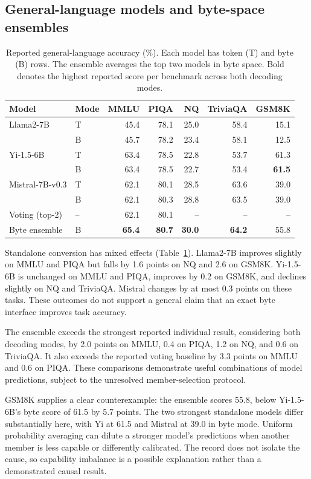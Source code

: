 \documentclass{article}
\begin{document}
\subsection{General-language models and byte-space ensembles}
\label{sec:general}
\begin{table}[t]
\caption{Reported general-language accuracy (\%). Each model has token (T) and byte (B) rows. The ensemble averages the top two models in byte space. Bold denotes the highest reported score per benchmark across both decoding modes.}
\label{tab:general}
\centering
\begin{tabular}{llrrrrr}
\toprule
Model & Mode & MMLU & PIQA & NQ & TriviaQA & GSM8K\\
\midrule
Llama2-7B & T & 45.4 & 78.1 & 25.0 & 58.4 & 15.1\\
 & B & 45.7 & 78.2 & 23.4 & 58.1 & 12.5\\
Yi-1.5-6B & T & 63.4 & 78.5 & 22.8 & 53.7 & 61.3\\
 & B & 63.4 & 78.5 & 22.7 & 53.4 & \textbf{61.5}\\
Mistral-7B-v0.3 & T & 62.1 & 80.1 & 28.5 & 63.6 & 39.0\\
 & B & 62.1 & 80.3 & 28.8 & 63.5 & 39.0\\
\midrule
Voting (top-2) & -- & 62.1 & 80.1 & -- & -- & --\\
Byte ensemble & B & \textbf{65.4} & \textbf{80.7} & \textbf{30.0} & \textbf{64.2} & 55.8\\
\bottomrule
\end{tabular}
\end{table}

Standalone conversion has mixed effects (Table~\ref{tab:general}). Llama2-7B improves slightly on MMLU and PIQA but falls by 1.6 points on NQ and 2.6 on GSM8K. Yi-1.5-6B is unchanged on MMLU and PIQA, improves by 0.2 on GSM8K, and declines slightly on NQ and TriviaQA. Mistral changes by at most 0.3 points on these tasks. These outcomes do not support a general claim that an exact byte interface improves task accuracy.

The ensemble exceeds the strongest reported individual result, considering both decoding modes, by 2.0 points on MMLU, 0.4 on PIQA, 1.2 on NQ, and 0.6 on TriviaQA. It also exceeds the reported voting baseline by 3.3 points on MMLU and 0.6 on PIQA. These comparisons demonstrate useful combinations of model predictions, subject to the unresolved member-selection protocol.

GSM8K supplies a clear counterexample: the ensemble scores 55.8, below Yi-1.5-6B's byte score of 61.5 by 5.7 points. The two strongest standalone models differ substantially here, with Yi at 61.5 and Mistral at 39.0 in byte mode. Uniform probability averaging can dilute a stronger model's predictions when another member is less capable or differently calibrated. The record does not isolate the cause, so capability imbalance is a possible explanation rather than a demonstrated causal result.
\end{document}
